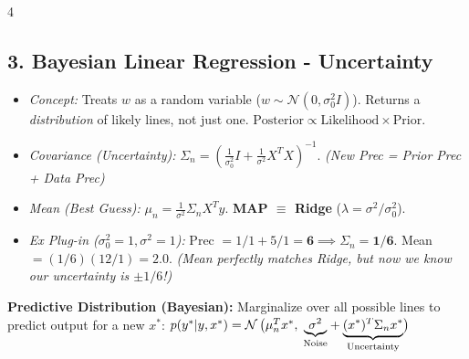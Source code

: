 \documentclass[9pt]{extarticle}
\begin{document}
\begin{multicols*}{4}
\subsection*{3. Bayesian Linear Regression - Uncertainty}
\begin{itemize}
    \item \textit{Concept:} Treats $w$ as a random variable ($w \sim \mathcal{N}(0, \sigma_0^2 I)$). Returns a \textit{distribution} of likely lines, not just one. $\text{Posterior} \propto \text{Likelihood} \times \text{Prior}$.
    \item \textit{Covariance (Uncertainty):} $\Sigma_n = (\frac{1}{\sigma_0^2}I + \frac{1}{\sigma^2}X^T X)^{-1}$. \textit{(New Prec = Prior Prec + Data Prec)}
    \item \textit{Mean (Best Guess):} $\mu_n = \frac{1}{\sigma^2}\Sigma_n X^T y$. \quad \textbf{MAP $\equiv$ Ridge} ($\lambda = \sigma^2/\sigma_0^2$).
    \item \textit{Ex Plug-in ($\sigma_0^2=1, \sigma^2=1$):} Prec $= 1/1 + 5/1 = \mathbf{6} \implies \Sigma_n = \mathbf{1/6}$. Mean $= (1/6)(12/1) = \mathbf{2.0}$. \textit{(Mean perfectly matches Ridge, but now we know our uncertainty is $\pm 1/6$!)}
\end{itemize}

\textbf{Predictive Distribution (Bayesian):} 
Marginalize over all possible lines to predict output for a new $x^*$:
$p(y^*|y, x^*) = \mathcal{N}\left(\mu_n^T x^*, \;\smash{\underbrace{\sigma^2}_{\text{Noise}}} + \smash{\underbrace{(x^*)^T \Sigma_n x^*}_{\text{Uncertainty}}}\right)$
\vspace{1.5em}


\end{multicols*}
\end{document}
